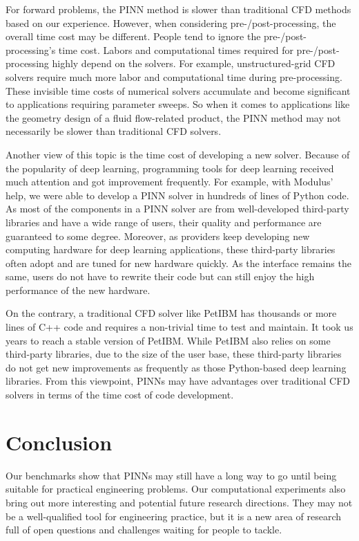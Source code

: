 For forward problems, the PINN method is slower than traditional CFD methods based on our experience.
However, when considering pre-/post-processing, the overall time cost may be different.
People tend to ignore the pre-/post-processing's time cost.
Labors and computational times required for pre-/post-processing highly depend on the solvers.
For example, unstructured-grid CFD solvers require much more labor and computational time during pre-processing.
These invisible time costs of numerical solvers accumulate and become significant to applications requiring parameter sweeps.
So when it comes to applications like the geometry design of a fluid flow-related product, the PINN method may not necessarily be slower than traditional CFD solvers.

Another view of this topic is the time cost of developing a new solver. 
Because of the popularity of deep learning, programming tools for deep learning received much attention and got improvement frequently.
For example, with Modulus' help, we were able to develop a PINN solver in hundreds of lines of Python code.
As most of the components in a PINN solver are from well-developed third-party libraries and have a wide range of users, their quality and performance are guaranteed to some degree.
Moreover, as providers keep developing new computing hardware for deep learning applications, these third-party libraries often adopt and are tuned for new hardware quickly.
As the interface remains the same, users do not have to rewrite their code but can still enjoy the high performance of the new hardware.

On the contrary, a traditional CFD solver like PetIBM has thousands or more lines of C++ code and requires a non-trivial time to test and maintain.
It took us years to reach a stable version of PetIBM.
While PetIBM also relies on some third-party libraries, due to the size of the user base, these third-party libraries do not get new improvements as frequently as those Python-based deep learning libraries.
From this viewpoint, PINNs may have advantages over traditional CFD solvers in terms of the time cost of code development.

\section{Conclusion}

Our benchmarks show that PINNs may still have a long way to go until being suitable for practical engineering problems.
Our computational experiments also bring out more interesting and potential future research directions.
They may not be a well-qualified tool for engineering practice, but it is a new area of research full of open questions and challenges waiting for people to tackle.

